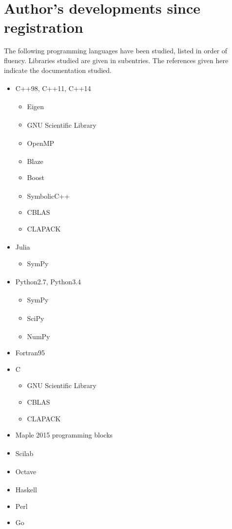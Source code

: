 \documentclass[a4paper, 12pt]{article}
\newcommand{\site}[1]{\textsuperscript{\textcolor{blue}{\cite{#1}}}}
\begin{document}
	\section{Author's developments since registration}
	The following programming languages have been studied, listed in order of fluency. Libraries studied are given in subentries. The references given here indicate the documentation studied.
	\begin{multicols}{2}
	\begin{itemize}
		\item C++98\textsuperscript{\textcolor{blue}{\cite{acc, alex}}}, C++11\site{c++ref}, C++14
			\begin{itemize}
				\item Eigen\site{eigen}
				\item GNU Scientific Library\site{gsl}
				\item OpenMP\site{openmp}
				\item Blaze\site{blaze}
				\item Boost
				\item SymbolicC++\site{symbolicc}
				\item CBLAS
				\item CLAPACK
			\end{itemize}
		\item Julia\site{julia}
			\begin{itemize}
				\item SymPy
			\end{itemize}
		\item Python2.7\site{python}, Python3.4
			\begin{itemize}
				\item SymPy\site{sympy}
				\item SciPy\site{scipy}
				\item NumPy\site{numpy}
			\end{itemize}
			\columnbreak
		\item Fortran95
		\item C
			\begin{itemize}
				\item GNU Scientific Library
				\item CBLAS
				\item CLAPACK
			\end{itemize}
		\item Maple 2015 programming blocks
		\item Scilab\site{scilab}
		\item Octave\site{octave}
		\item Haskell\site{haskell}
		\item Perl
		\item Go
	\end{itemize}
\end{multicols}
\end{document}
